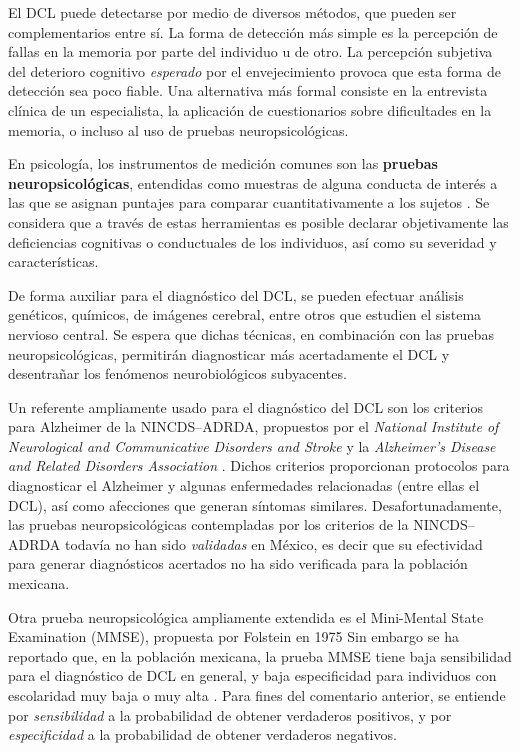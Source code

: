 \documentclass[12pt,letterpaper]{book}
\begin{document}
El DCL puede detectarse por medio de diversos métodos, que pueden ser complementarios entre sí. 
%
La forma de detección más simple es la percepción de fallas en la memoria por parte del individuo u de otro. 
%
La percepción subjetiva del deterioro cognitivo \textit{esperado} por el envejecimiento provoca que esta forma de detección sea poco fiable.
%
Una alternativa más {formal} consiste en la entrevista clínica de un especialista, la aplicación de cuestionarios sobre dificultades en la memoria, o incluso al uso de pruebas neuropsicológicas. 

En psicología, los instrumentos de medición comunes son las \textbf{pruebas neuropsicológicas}, 
entendidas como muestras de alguna conducta de interés a las que se asignan puntajes para comparar 
cuantitativamente a los sujetos \cite{Ardila12}.
%
Se considera que a través de estas herramientas es posible declarar objetivamente las deficiencias cognitivas o conductuales de los individuos, así como su severidad y características.

De forma auxiliar para el diagnóstico del DCL, se pueden efectuar análisis genéticos, químicos, de imágenes cerebral, entre otros que estudien el sistema nervioso central.
%
Se espera que dichas técnicas, en combinación con las pruebas neuropsicológicas, permitirán diagnosticar más acertadamente el DCL y desentrañar los fenómenos neurobiológicos subyacentes.

Un referente ampliamente usado para el diagnóstico del DCL son los criterios para Alzheimer de la NINCDS--ADRDA, propuestos %
por el \textit{National Institute of Neurological and Communicative Disorders and Stroke} y la \textit{Alzheimer's Disease and Related Disorders Association} \cite{McKhann,Dubois07}. 
%
Dichos criterios proporcionan protocolos para diagnosticar el Alzheimer y algunas enfermedades relacionadas (entre ellas el DCL), así como afecciones que generan síntomas similares. 
%
Desafortunadamente, las pruebas neuropsicológicas contempladas por los criterios de la NINCDS--ADRDA todavía no han sido \textit{validadas} en México, es decir que su efectividad para generar diagnósticos acertados no ha sido verificada para la población mexicana. 

Otra prueba neuropsicológica ampliamente extendida es el Mini-Mental State Examination (MMSE), propuesta por Folstein en 1975 \cite{folstein75} %
%
Sin embargo se ha reportado que, en la población mexicana, la prueba MMSE tiene baja sensibilidad para el diagnóstico de DCL en general, y baja especificidad para individuos con escolaridad muy baja o muy alta \cite{Ostrosky00}.
%
Para fines del comentario anterior, se entiende por \textit{sensibilidad} a la probabilidad de obtener verdaderos positivos, y por \textit{especificidad} a la probabilidad de obtener verdaderos negativos.
\end{document}
